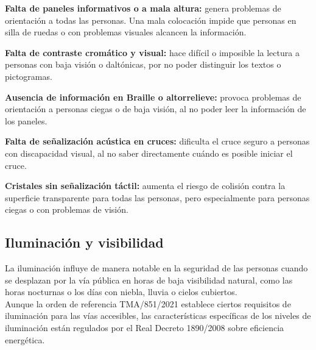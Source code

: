 \begin{inconvenientes}
  \item \textbf{Falta de paneles informativos o a mala altura:} genera problemas de orientación a todas las personas. Una mala colocación impide que personas en silla de ruedas o con problemas visuales alcancen la información.
  \item \textbf{Falta de contraste cromático y visual:} hace difícil o imposible la lectura a personas con baja visión o daltónicas, por no poder distinguir los textos o pictogramas.
  \item \textbf{Ausencia de información en Braille o altorrelieve:} provoca problemas de orientación a personas ciegas o de baja visión, al no poder leer la información de los paneles.
  \item \textbf{Falta de señalización acústica en cruces:} dificulta el cruce seguro a personas con discapacidad visual, al no saber directamente cuándo es posible iniciar el cruce.
  \item \textbf{Cristales sin señalización táctil:} aumenta el riesgo de colisión contra la superficie transparente para todas las personas, pero especialmente para personas ciegas o con problemas de visión.
\end{inconvenientes}

        {}

\parametroclave{\porrellenar}

\subsection{Iluminación y visibilidad}
\label{subsec:iluminacion}

La iluminación influye de manera notable en la seguridad de las personas cuando se desplazan por la vía pública en horas de baja visibilidad natural, como las horas nocturnas o los días con niebla, lluvia o cielos cubiertos.
\\

Aunque la orden de referencia TMA/851/2021 establece ciertos requisitos de iluminación para las vías accesibles, las características específicas de los niveles de iluminación están regulados por el Real Decreto 1890/2008 sobre eficiencia energética.
\\

